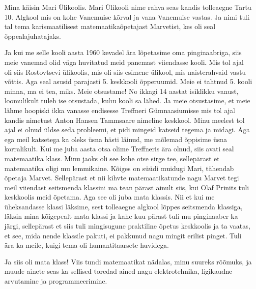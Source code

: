

Mina käisin Mari Ülikoolis. Mari 
Ülikooli nime rahva seas kandis tolleaegne Tartu 10. Algkool mis on kohe Vanemuise 
kõrval ja vana Vanemuise vastas. Ja nimi tuli tal tema karismaatilisest 
matemaatikaõpetajast Marvetist, kes oli seal õppealajuhatajaks.

Ja kui me selle kooli aasta 1960 kevadel ära lõpetasime oma pinginaabriga, siis 
meie vanemad olid väga huvitatud meid panemast viiendasse kooli. Mis tol ajal oli siis Rostovtsevi ülikoolis, mis oli siis esimene 
ülikool, mis naisterahvaid vastu võttis. Aga seal asusid parajasti 5. keskkooli 
õpperuumid. Meie ei tahtnud 5. kooli minna, ma ei tea, miks. Meie otsustame! No 
ikkagi 14 aastat isiklikku vanust, loomulikult tuleb ise otsustada, kuhu kooli 
sa lähed. Ja meie otsustasime, et meie lähme hoopiski ikka vanasse endisesse 
Treffneri Gümnaasiumisse mis tol ajal kandis 
nimetust Anton Hansen Tammsaare nimeline keskkool. Minu meelest tol ajal ei 
olnud üldse seda probleemi, et pidi mingeid katseid tegema ja midagi. Aga ega 
meil katsetega ka oleks üsna hästi läinud, me mõlemad õppisime üsna 
korralikult. Kui me juba aasta otsa olime Treffneris ära olnud, siis avati seal 
matemaatika klass. Minu jaoks oli see kohe otse sirge tee, sellepärast et 
matemaatika oligi mu lemmikaine. Kõiges on süüdi muidugi Mari, tähendab õpetaja 
Marvet. Sellepärast et nii kihvte matemaatikatunde 
nagu Marvet tegi meil viiendast seitsmenda klassini ma tean pärast ainult siis, 
kui Olaf Prinits tuli keskkoolis meid õpetama. Aga 
see oli juba mata klassis. Nii et kui me üheksandasse klassi läksime, sest 
tolleaegne algkool lõppes seitsmenda klassiga, läksin mina kõigepealt mata 
klassi ja kahe kuu pärast tuli mu pinginaaber ka järgi, sellepärast et siis 
tuli mingisugune praktiline õpetus keskkoolis ja  ta vaatas, et see, mida nende 
klassile pakuti, ei pakkunud nagu mingit erilist pinget. Tuli ära ka meile, 
kuigi tema oli humantitaarsete huvidega. 

Ja siis oli mata klass! Viis tundi matemaatikat nädalas, minu suureks rõõmuks, 
ja muude ainete seas ka sellised toredad ained nagu elektrotehnika, ligikaudne 
arvutamine ja programmeerimine. 

